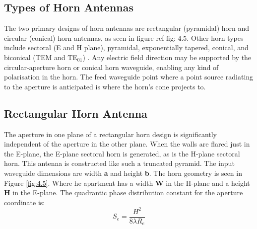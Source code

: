{%

\subsection{Types of Horn Antennas}

The two primary designs of horn antennas are rectangular (pyramidal) horn and circular (conical) horn antennas, as seen in figure ref fig: 4.5.
Other horn types include sectoral (E and H plane), pyramidal, exponentially tapered, conical, and biconical (TEM and TE\(_01\)) \cite{kraus1966radio}. Any electric field direction may be supported by the circular-aperture horn or conical horn waveguide, enabling any kind of polarisation in the horn. The feed waveguide point where a point source radiating to the aperture is anticipated is where the horn's cone projects to. 

\subsection{Rectangular Horn Antenna}
 
The aperture in one plane of a rectangular horn design is significantly independent of the aperture in the other plane. When the walls are flared just in the E-plane, the E-plane sectoral horn is generated, as is the H-plane sectoral horn. This antenna is constructed like such a truncated pyramid. The input waveguide dimensions are width \textbf{a} and height \textbf{b}. The horn geometry is seen in Figure \ref{fig:4.5}. Where  he apartment has a width \textbf{W} in the H-plane and a height \textbf{H} in the E-plane. The quadrantic phase distribution constant for the aperture coordinate is:
\begin{equation}
    S_e = \frac{H^2}{8\lambda R_e}   
\end{equation}

}

